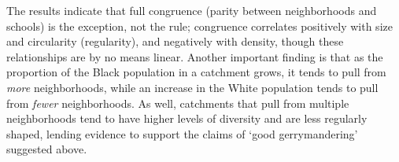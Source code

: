 The results indicate that full congruence (parity between
neighborhoods and schools) is the exception, not the rule; congruence
correlates positively with size and circularity (regularity), and
negatively with density, though these relationships are by no means
linear. Another important finding is that as the proportion of the
Black population in a catchment grows, it tends to pull from
\emph{more} neighborhoods, while an increase in the White population
tends to pull from \emph{fewer} neighborhoods. As well, catchments
that pull from multiple neighborhoods tend to have higher levels of
diversity and are less regularly shaped, lending evidence to support
the claims of `good gerrymandering' suggested above.
